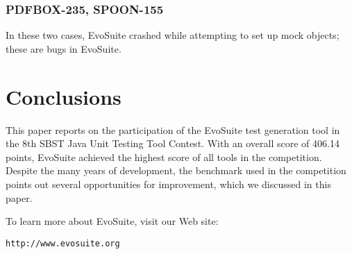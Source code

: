 \documentclass[sigconf]{acmart}
\newcommand{\EVOSUITE}{{\sc EvoSuite}\xspace}
\newcommand{\TOTALPOINTS}{{406.14}\xspace}
\begin{document}

\subsubsection*{PDFBOX-235, SPOON-155} In these two cases, \EVOSUITE crashed while attempting to set up mock objects; these are bugs in \EVOSUITE.


\section{Conclusions}

This paper reports on the participation of the \EVOSUITE test
generation tool in the 8th SBST Java Unit Testing Tool Contest. With
an overall score of \TOTALPOINTS points, \EVOSUITE achieved the
highest score of all tools in the competition. Despite the many years of development, the benchmark used in the competition points out several opportunities for improvement, which we discussed in this paper.

To learn more about \EVOSUITE, visit our Web site:
\begin{center}
\texttt{http://www.evosuite.org}
\end{center}


\balance


\end{document}
